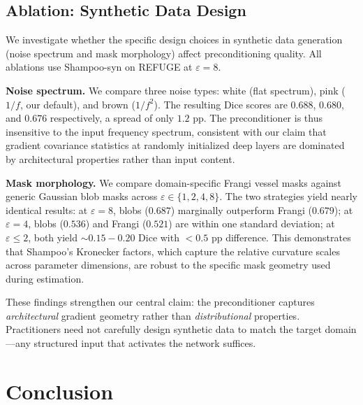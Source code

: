 \documentclass[runningheads]{llncs}
\begin{document}
\subsection{Ablation: Synthetic Data Design}
\label{subsec:ablation_synth}

We investigate whether the specific design choices in synthetic data generation (noise spectrum and mask morphology) affect preconditioning quality. All ablations use Shampoo-syn on REFUGE at $\varepsilon{=}8$.

\textbf{Noise spectrum.}
We compare three noise types: white (flat spectrum), pink ($1/f$, our default), and brown ($1/f^2$). The resulting Dice scores are $0.688$, $0.680$, and $0.676$ respectively, a spread of only $1.2$ pp. The preconditioner is thus insensitive to the input frequency spectrum, consistent with our claim that gradient covariance statistics at randomly initialized deep layers are dominated by architectural properties rather than input content.

\textbf{Mask morphology.}
We compare domain-specific Frangi vessel masks against generic Gaussian blob masks across $\varepsilon\in\{1,2,4,8\}$. The two strategies yield nearly identical results: at $\varepsilon{=}8$, blobs ($0.687$) marginally outperform Frangi ($0.679$); at $\varepsilon{=}4$, blobs ($0.536$) and Frangi ($0.521$) are within one standard deviation; at $\varepsilon{\leq}2$, both yield ${\sim}0.15{-}0.20$ Dice with $<0.5$ pp difference. This demonstrates that Shampoo's Kronecker factors, which capture the relative curvature scales across parameter dimensions, are robust to the specific mask geometry used during estimation.

These findings strengthen our central claim: the preconditioner captures \emph{architectural} gradient geometry rather than \emph{distributional} properties. Practitioners need not carefully design synthetic data to match the target domain---any structured input that activates the network suffices.

\section{Conclusion}
\label{sec:conclusion}
\end{document}
